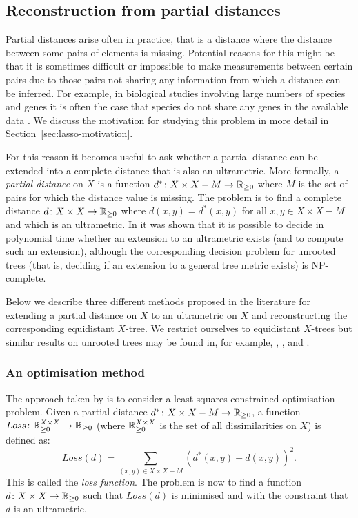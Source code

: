 \subsection{Reconstruction from partial distances}
\label{sec:constr-from-part}

Partial distances arise often in practice, that is a distance where the
distance between some pairs of elements is missing.  Potential reasons for
this might be that it is sometimes difficult or impossible to make
measurements between certain pairs due to those pairs not sharing any
information from which a distance can be inferred.  For example, in biological
studies involving large numbers of species and genes it is often the case that
species do not share any genes in the available data
\cite{criscuolo2008fastnj}.  We discuss the motivation for studying this
problem in more detail in Section~\ref{sec:lasso-motivation}.

For this reason it becomes useful to ask whether a partial distance can be
extended into a complete distance that is also an ultrametric.  More formally,
a \textit{partial distance} on $X$ is a function $d^* \colon X \times X - M
\to {\mathbb R}_{\geq 0}$ where $M$ is the set of pairs for which the distance value is
missing.  The problem is to find a complete distance $d \colon X \times X \to
{\mathbb R}_{\geq 0}$ where $d(x,y) = d^*(x,y)$ for all $x,y \in X \times X - M$ and which is
an ultrametric.  In \cite{farach1995robust} it was shown that it is possible
to decide in polynomial time whether an extension to an ultrametric exists
(and to compute such an extension), although the corresponding decision
problem for unrooted trees (that is, deciding if an extension to a general
tree metric exists) is NP-complete.

Below we describe three different methods proposed in the literature for
extending a partial distance on $X$ to an ultrametric on $X$ and
reconstructing the corresponding equidistant $X$-tree.  We restrict ourselves
to equidistant $X$-trees but similar results on unrooted trees may be found
in, for example, \cite{guenoche1999approximations}, \cite{farach1995robust},
\cite{makarenkov2001nouvelle} and \cite{guenoche2004extension}.

\subsubsection{An optimisation method}
\label{sec:part-dist-optim-method}

The approach taken by \citet{de1984ultrametric} is to consider a least squares
constrained optimisation problem.  Given a partial distance $d^* \colon X
\times X - M \to {\mathbb R}_{\geq 0}$, a function $Loss \colon {\mathbb R}_{\geq 0}^{X \times X} \to {\mathbb R}_{\geq 0}$
(where ${\mathbb R}_{\geq 0}^{X \times X}$ is the set of all dissimilarities on $X$) is
defined as:
\begin{equation*}
  \label{eq:partial-dist-least-squares}
  Loss(d) = \sum_{(x,y) \in X \times X - M} (d^*(x,y)-d(x,y))^2.
\end{equation*}
This is called the \textit{loss function}.  The problem is now to find a
function $d \colon X \times X \to {\mathbb R}_{\geq 0}$ such that $Loss(d)$ is minimised and
with the constraint that $d$ is an ultrametric.

